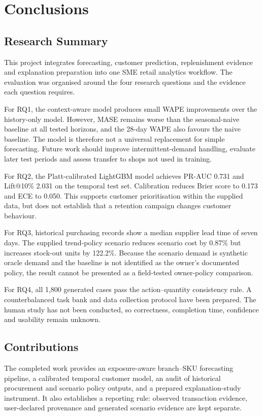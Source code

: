 \chapter{Conclusions}
\label{chapter_conclusion}

\section{Research Summary}
This project integrates forecasting, customer prediction, replenishment evidence and explanation preparation into one SME retail analytics workflow. The evaluation was organised around the four research questions and the evidence each question requires.

For RQ1, the context-aware model produces small WAPE improvements over the history-only model. However, MASE remains worse than the seasonal-naive baseline at all tested horizons, and the 28-day WAPE also favours the naive baseline. The model is therefore not a universal replacement for simple forecasting. Future work should improve intermittent-demand handling, evaluate later test periods and assess transfer to shops not used in training.

For RQ2, the Platt-calibrated LightGBM model achieves PR-AUC 0.731 and Lift@10\% 2.031 on the temporal test set. Calibration reduces Brier score to 0.173 and ECE to 0.050. This supports customer prioritisation within the supplied data, but does not establish that a retention campaign changes customer behaviour.

For RQ3, historical purchasing records show a median supplier lead time of seven days. The supplied trend-policy scenario reduces scenario cost by 0.87\% but increases stock-out units by 122.2\%. Because the scenario demand is synthetic oracle demand and the baseline is not identified as the owner's documented policy, the result cannot be presented as a field-tested owner-policy comparison.

For RQ4, all 1,800 generated cases pass the action--quantity consistency rule. A counterbalanced task bank and data collection protocol have been prepared. The human study has not been conducted, so correctness, completion time, confidence and usability remain unknown.

\section{Contributions}
The completed work provides an exposure-aware branch--SKU forecasting pipeline, a calibrated temporal customer model, an audit of historical procurement and scenario policy outputs, and a prepared explanation-study instrument. It also establishes a reporting rule: observed transaction evidence, user-declared provenance and generated scenario evidence are kept separate.

